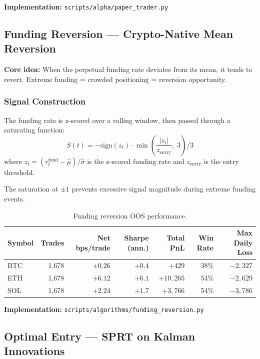 \documentclass[11pt,a4paper]{article}
\newcommand{\toprule}{\hline\hline}
\newcommand{\midrule}{\hline}
\newcommand{\bottomrule}{\hline\hline}
\begin{document}
\textbf{Implementation:} \texttt{scripts/alpha/paper\_trader.py}

\subsection{Funding Reversion --- Crypto-Native Mean Reversion}

\textbf{Core idea:} When the perpetual funding rate deviates from its mean, it tends to revert. Extreme funding = crowded positioning = reversion opportunity.

\subsubsection*{Signal Construction}

The funding rate is z-scored over a rolling window, then passed through a saturating function:
\begin{equation}
S(t) = -\mathrm{sign}(z_t) \cdot \min\!\left(\frac{|z_t|}{z_{\text{entry}}},\; 3\right) \bigg/ 3
\end{equation}
where $z_t = (r_t^{\text{fund}} - \hat{\mu}) / \hat{\sigma}$ is the z-scored funding rate and $z_{\text{entry}}$ is the entry threshold.

The saturation at $\pm 1$ prevents excessive signal magnitude during extreme funding events.

\begin{table}[h!]
\centering
\caption{Funding reversion OOS performance.}
\begin{tabular}{@{}lrrrrrr@{}}
\toprule
Symbol & Trades & Net bps/trade & Sharpe (ann.) & Total PnL & Win Rate & Max Daily Loss \\
\midrule
BTC & 1{,}678 & $+0.26$ & $+0.4$ & $+429$ & 38\% & $-2{,}327$ \\
ETH & 1{,}678 & $+6.12$ & $+6.1$ & $+10{,}265$ & 54\% & $-2{,}629$ \\
SOL & 1{,}678 & $+2.24$ & $+1.7$ & $+3{,}766$ & 54\% & $-3{,}786$ \\
\bottomrule
\end{tabular}
\end{table}

\textbf{Implementation:} \texttt{scripts/algorithms/funding\_reversion.py}

\subsection{Optimal Entry --- SPRT on Kalman Innovations}
\end{document}
